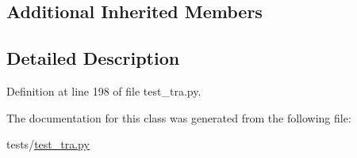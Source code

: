 \subsection*{Additional Inherited Members}


\subsection{Detailed Description}


Definition at line 198 of file test\+\_\+tra.\+py.



The documentation for this class was generated from the following file\+:\begin{DoxyCompactItemize}
\item 
tests/\hyperlink{test__tra_8py}{test\+\_\+tra.\+py}\end{DoxyCompactItemize}
